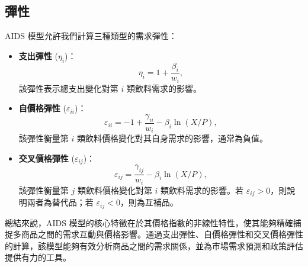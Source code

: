 \subsection*{彈性}
AIDS 模型允許我們計算三種類型的需求彈性：
\begin{itemize}
    \item \textbf{支出彈性} (\(\eta_i\))：
    \begin{equation}
    \eta_i = 1 + \frac{\beta_i}{w_i},
    \end{equation}
    該彈性表示總支出變化對第 \(i\) 類飲料需求的影響。
    \item \textbf{自價格彈性} (\(\varepsilon_{ii}\))：
    \begin{equation}
    \varepsilon_{ii} = -1 + \frac{\gamma_{ii}}{w_i} - \beta_i \ln(X / P),
    \end{equation}
    該彈性衡量第 \(i\) 類飲料價格變化對其自身需求的影響，通常為負值。
    \item \textbf{交叉價格彈性} (\(\varepsilon_{ij}\))：
    \begin{equation}
    \varepsilon_{ij} = \frac{\gamma_{ij}}{w_i} - \beta_i \ln(X / P),
    \end{equation}
    該彈性衡量第 \(j\) 類飲料價格變化對第 \(i\) 類飲料需求的影響。若 \(\varepsilon_{ij} > 0\)，則說明兩者為替代品；若 \(\varepsilon_{ij} < 0\)，則為互補品。
\end{itemize}

總結來說，AIDS 模型的核心特徵在於其價格指數的非線性特性，使其能夠精確捕捉多商品之間的需求互動與價格影響。通過支出彈性、自價格彈性和交叉價格彈性的計算，該模型能夠有效分析商品之間的需求關係，並為市場需求預測和政策評估提供有力的工具。
